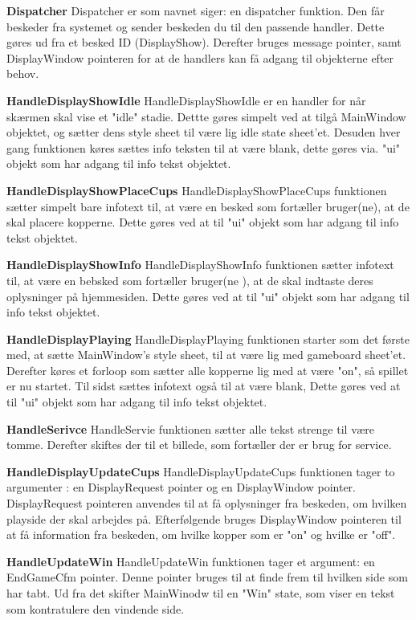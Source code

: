 \documentclass[Softwaredesign/Softwaredesign_main.tex]{subfiles}
\begin{document}
\textbf{Dispatcher} 
Dispatcher er som navnet siger: en dispatcher funktion. Den får beskeder fra systemet og sender beskeden du til den passende handler. Dette gøres ud fra et besked ID (DisplayShow). Derefter bruges message pointer, samt  DisplayWindow pointeren for at de handlers kan få adgang til objekterne efter behov.

\textbf{HandleDisplayShowIdle}
HandleDisplayShowIdle er en handler for når skærmen skal vise et "idle" stadie.  Dettte gøres simpelt ved at tilgå MainWindow objektet, og sætter dens style sheet til være lig  idle state sheet'et. Desuden hver gang funktionen køres sættes info teksten til at være blank, dette gøres via. "ui" objekt som har adgang til info tekst objektet. 

\textbf{HandleDisplayShowPlaceCups}
HandleDisplayShowPlaceCups funktionen sætter simpelt bare infotext til, at være en besked som fortæller bruger(ne), at de skal placere kopperne.  Dette gøres ved at til "ui" objekt som har adgang til info tekst objektet.

\textbf{HandleDisplayShowInfo}
HandleDisplayShowInfo funktionen sætter infotext til,  at være en bebsked som fortæller bruger(ne ), at de skal indtaste deres oplysninger på hjemmesiden. Dette gøres ved at til "ui" objekt som har adgang til info tekst objektet.

\textbf{HandleDisplayPlaying }
HandleDisplayPlaying funktionen starter som det første med, at sætte MainWindow's style sheet, til at være lig med gameboard sheet'et.  Derefter køres et forloop som sætter alle kopperne lig med at være "on", så spillet er nu startet. Til sidst sættes infotext også til at være blank,  Dette gøres ved at til "ui" objekt som har adgang til info tekst objektet. 

\textbf{HandleSerivce}
HandleServie funktionen sætter alle tekst strenge til være tomme. Derefter skiftes der til et billede, som fortæller der er brug for service.

\textbf{HandleDisplayUpdateCups}
HandleDisplayUpdateCups funktionen tager to argumenter :  en DisplayRequest pointer og en DisplayWindow pointer.  DisplayRequest pointeren anvendes til at få oplysninger fra beskeden,  om hvilken playside der skal arbejdes på. Efterfølgende bruges DisplayWindow pointeren  til at få information fra beskeden, om hvilke kopper som er "on" og hvilke er "off". 
 
\textbf{HandleUpdateWin}
HandleUpdateWin funktionen tager et argument: en EndGameCfm pointer. Denne pointer bruges til at finde frem til hvilken side som har tabt. Ud fra det skifter MainWinodw til en "Win" state, som viser en tekst som kontratulere den vindende side.  
\end{document}

